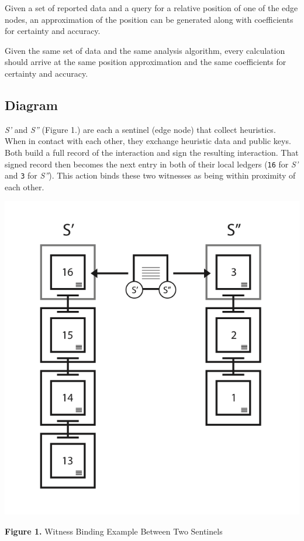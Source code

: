 \documentclass{article}
\begin{document}
Given a set of reported data and a query for a relative position of one of the edge nodes, an approximation of the position can be generated along with coefficients for certainty and accuracy.

Given the same set of data and the same analysis algorithm, every calculation should arrive at the same position approximation and the same coefficients for certainty and accuracy.

\subsection {Diagram}
\textit{S'} and \textit{S''} (Figure 1.) are each a \Gls{sentinel} (edge node) that collect \glspl{heuristic}. When in contact with each other, they exchange heuristic data and public keys. Both build a full record of the interaction and sign the resulting interaction. That signed record then becomes the next entry in both of their local ledgers (\texttt{16} for \textit{S'} and \texttt{3} for \textit{S''}). This action binds these two witnesses as being within proximity of each other.

\includegraphics [width=\textwidth]{boundwitness}
\begin{center}\textbf{Figure 1.}  Witness Binding Example Between Two Sentinels
\end{center}
\end{document}
